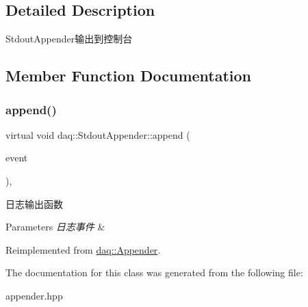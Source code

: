 \subsection{Detailed Description}
Stdout\+Appender输出到控制台 

\subsection{Member Function Documentation}
\mbox{\label{classdaq_1_1StdoutAppender_ad51f98e464de89c07e5fe30a817f45d2}} 
\subsubsection{\texorpdfstring{append()}{append()}}
{\footnotesize\ttfamily virtual void daq\+::\+Stdout\+Appender\+::append (\begin{DoxyParamCaption}\item[{Log\+Event\+::sptr}]{event }\end{DoxyParamCaption})\hspace{0.3cm}{\ttfamily [override]}, {\ttfamily [virtual]}}



日志输出函数 


\begin{DoxyParams}{Parameters}
{\em 日志事件} & \\
\hline
\end{DoxyParams}


Reimplemented from \hyperlink{classdaq_1_1Appender_a66e8f896daf7ad4a82769949b351b994}{daq\+::\+Appender}.



The documentation for this class was generated from the following file\+:\begin{DoxyCompactItemize}
\item 
appender.\+hpp\end{DoxyCompactItemize}
